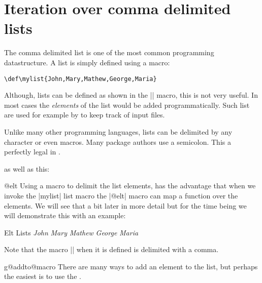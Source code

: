 \section{Iteration over comma delimited lists}

The comma delimited list is one of the most common programming datastructure. A list is simply defined using a macro:

\begin{verbatim}
\def\mylist{John,Mary,Mathew,George,Maria}
\end{verbatim}

Although, lists can be defined as shown in the |\mylist| macro, this is not very useful. In most cases the \textit{elements} of the list would be added programmatically. Such list are used for example by \latex to keep track of input files.

Unlike many other programming languages, lists can be delimited by any character or even macros. Many package authors use a semicolon. This a perfectly legal in \tex.

\begin{teX}
\end{teX}
as well as this:

\begin{teX}
\end{teX}

\begin{docCommand}{@elt}{}
Using a macro to delimit the list elements, has the advantage that when we invoke the |mylist| list macro the |@elt| macro can map a function over the elements. We will see that a bit later in more detail but for the time being we will demonstrate this with an example:
\end{docCommand}

\begin{texexample}{Elt Lists}{}
\def\mylist{\@elt John,\@elt Mary,\@elt Mathew, \@elt George, \@elt Maria,}
\def\@elt#1,{\textit{#1} }
\mylist
\end{texexample}

Note that the macro |\@elt| when it is defined is delimited with a comma. 


\begin{docCommand}{g@addto@macro}{}
There are many ways to add an element to the list, but perhaps the easiest is to use the \latex \cmd{\g@addto@macro}. 
\end{docCommand}

